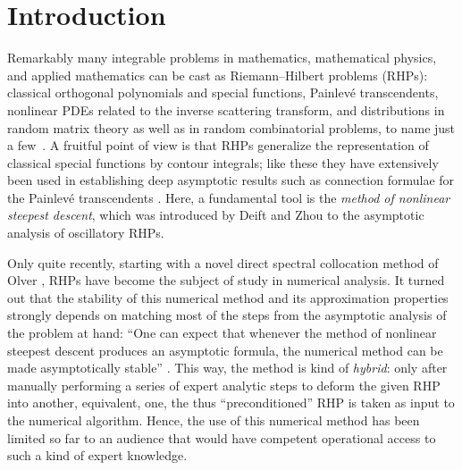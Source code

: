 \documentclass[reqno]{amsart}
\begin{document}
\maketitle

\section{Introduction}\label{sec:intro}

Remarkably many integrable problems in mathematics, mathematical physics, and applied mathematics can be cast as Riemann--Hilbert problems (RHPs): classical orthogonal polynomials and special functions, Painlevé transcendents, nonlinear PDEs related to the inverse scattering transform, and distributions in random matrix theory as well as in random combinatorial problems, to name just a few~\cite{MR2011605}. A fruitful point of view is that RHPs generalize the representation of classical special functions
by contour integrals; like these they have extensively been used in establishing deep asymptotic results such as connection
formulae for the Painlevé transcendents \cite{fokas:2006:ptr}. Here, a fundamental tool is the \emph{method of nonlinear steepest descent}, which was introduced by Deift and Zhou \cite{MR1207209} to the asymptotic analysis of oscillatory RHPs.

Only quite recently, starting with a novel direct spectral collocation method of Olver \cite{Olver:2011:NSR:1967343.1967345}, RHPs have become the subject of study in numerical analysis. It turned out that the stability of this numerical method
and its approximation properties strongly depends on matching most of the steps from the asymptotic analysis of the problem at hand: ``One can expect that whenever the method of nonlinear steepest descent produces an asymptotic formula, the numerical method can be made asymptotically stable'' \cite[p.~2]{1205.5604}. This way, the method is kind of {\em hybrid}: only after manually performing a series of expert analytic steps to deform the given RHP into another, equivalent, one, the thus ``preconditioned'' RHP is taken as input to the numerical algorithm. Hence, the use of this numerical method has been limited so far to an audience that would have competent operational access to such a kind of expert knowledge. 
\end{document}
